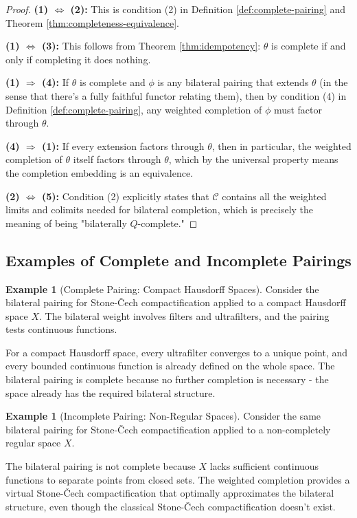 \documentclass[11pt]{article}
\theoremstyle{plain}
\theoremstyle{definition}
\newtheorem{example}[theorem]{Example}
\theoremstyle{remark}
\newcommand{\C}{\mathcal{C}}
\begin{document}
\begin{proof}
\textbf{(1) $\Leftrightarrow$ (2):} This is condition (2) in Definition \ref{def:complete-pairing} and Theorem \ref{thm:completeness-equivalence}.

\textbf{(1) $\Leftrightarrow$ (3):} This follows from Theorem \ref{thm:idempotency}: $\theta$ is complete if and only if completing it does nothing.

\textbf{(1) $\Rightarrow$ (4):} If $\theta$ is complete and $\phi$ is any bilateral pairing that extends $\theta$ (in the sense that there's a fully faithful functor relating them), then by condition (4) in Definition \ref{def:complete-pairing}, any weighted completion of $\phi$ must factor through $\theta$.

\textbf{(4) $\Rightarrow$ (1):} If every extension factors through $\theta$, then in particular, the weighted completion of $\theta$ itself factors through $\theta$, which by the universal property means the completion embedding is an equivalence.

\textbf{(2) $\Leftrightarrow$ (5):} Condition (2) explicitly states that $\C$ contains all the weighted limits and colimits needed for bilateral completion, which is precisely the meaning of being "bilaterally $Q$-complete."
\end{proof}

\subsection{Examples of Complete and Incomplete Pairings}

\begin{example}[Complete Pairing: Compact Hausdorff Spaces]
Consider the bilateral pairing for Stone-\v{C}ech compactification applied to a compact Hausdorff space $X$. The bilateral weight involves filters and ultrafilters, and the pairing tests continuous functions.

For a compact Hausdorff space, every ultrafilter converges to a unique point, and every bounded continuous function is already defined on the whole space. The bilateral pairing is complete because no further completion is necessary - the space already has the required bilateral structure.
\end{example}

\begin{example}[Incomplete Pairing: Non-Regular Spaces]
Consider the same bilateral pairing for Stone-\v{C}ech compactification applied to a non-completely regular space $X$. 

The bilateral pairing is not complete because $X$ lacks sufficient continuous functions to separate points from closed sets. The weighted completion provides a virtual Stone-\v{C}ech compactification that optimally approximates the bilateral structure, even though the classical Stone-\v{C}ech compactification doesn't exist.
\end{example}
\end{document}
